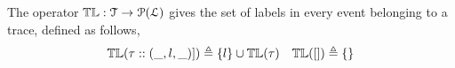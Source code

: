 %
  The operator $\mathbb{TL} : \mathcal{T} \to \mathcal{P}{(\mathcal{L})}$ gives the set of labels in every event belonging to 
  a trace,
defined as follows,
\[
\mathbb{TL}{(\mathtt{\tau}  :: (\_, l, \_)])} \triangleq \{l\} \cup \mathbb{TL}{(\mathtt{\tau} )}
~~~
\mathbb{TL}({[ ]}) \triangleq \{\}
\]
%
%
%
%
%

